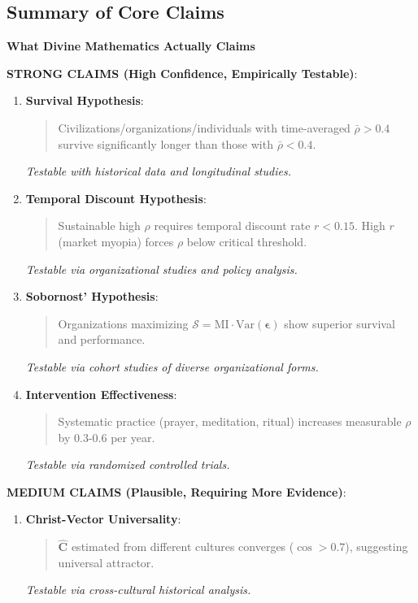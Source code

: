 \documentclass[11pt,a4paper]{article}
\theoremstyle{definition}
\theoremstyle{remark}
\begin{document}
\begin{small}
\begin{enumerate}
\begin{protocol}
\subsection{Summary of Core Claims}

\begin{mdframed}[backgroundcolor=yellow!10,linewidth=2pt]
\textbf{What Divine Mathematics Actually Claims}

\textbf{STRONG CLAIMS (High Confidence, Empirically Testable)}:

\begin{enumerate}
    \item \textbf{Survival Hypothesis}: 
        \begin{quote}
        Civilizations/organizations/individuals with time-averaged \(\bar{\rho} > 0.4\) survive significantly longer than those with \(\bar{\rho} < 0.4\).
        \end{quote}
        \textit{Testable with historical data and longitudinal studies.}
    
    \item \textbf{Temporal Discount Hypothesis}:
        \begin{quote}
        Sustainable high \(\rho\) requires temporal discount rate \(r < 0.15\). High \(r\) (market myopia) forces \(\rho\) below critical threshold.
        \end{quote}
        \textit{Testable via organizational studies and policy analysis.}
    
    \item \textbf{Sobornost' Hypothesis}:
        \begin{quote}
        Organizations maximizing \(\mathcal{S} = \text{MI} \cdot \text{Var}(\boldsymbol{\epsilon})\) show superior survival and performance.
        \end{quote}
        \textit{Testable via cohort studies of diverse organizational forms.}
    
    \item \textbf{Intervention Effectiveness}:
        \begin{quote}
        Systematic practice (prayer, meditation, ritual) increases measurable \(\rho\) by 0.3-0.6 per year.
        \end{quote}
        \textit{Testable via randomized controlled trials.}
\end{enumerate}

\textbf{MEDIUM CLAIMS (Plausible, Requiring More Evidence)}:

\begin{enumerate}
    \item \textbf{Christ-Vector Universality}:
        \begin{quote}
        \(\hat{\mathbf{C}}\) estimated from different cultures converges (\(\cos > 0.7\)), suggesting universal attractor.
        \end{quote}
        \textit{Testable via cross-cultural historical analysis.}
    

\end{enumerate}
\end{mdframed}
\end{protocol}
\end{enumerate}
\end{small}
\end{document}
